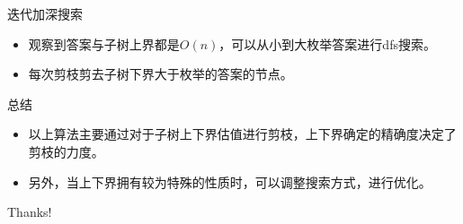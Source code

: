 \documentclass{beamer}
\begin{document}
    \begin{frame}{迭代加深搜索}
        \begin{itemize}
            \item 观察到答案与子树上界都是$O(n)$，可以从小到大枚举答案进行dfs搜索。
            \item 每次剪枝剪去子树下界大于枚举的答案的节点。
        \end{itemize}
    \end{frame}
    
    \begin{frame}{总结}
        \begin{itemize}
            \item 以上算法主要通过对于子树上下界估值进行剪枝，上下界确定的精确度决定了剪枝的力度。
            \item 另外，当上下界拥有较为特殊的性质时，可以调整搜索方式，进行优化。
        \end{itemize}
    \end{frame}
    
    \begin{frame}
        \begin{center}
            {\Huge\calligra Thanks!}
        \end{center}
    \end{frame}
\end{document}
